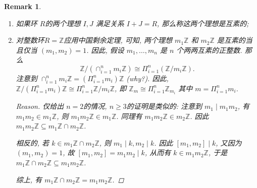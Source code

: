 \documentclass[a4paper,12pt]{ctexart}
\newcommand{\Z}{\mathbb{Z}}
\newtheorem{proof}{Proof}
\newtheorem{remark}{Remark}
\begin{document}
  \begin{remark}
    \begin{enumerate}[label=(\arabic{*})]
    \item 如果环 $ R $的两个理想 $ I, J $ 满足关系 $ I+J=R $, 那么称这两个理想是互素的; 
    \item 对整数环$ R=\Z $应用中国剩余定理, 可知, 两个理想 $ m_1\Z $ 和 $ m_2\Z $ 是互素的当且仅当 $ (m_1,m_2)=1 $.
    因此, 假设 $ m_1,\dots,m_n $ 是 $ n $ 个两两互素的正整数. 
    那么
    \[\Z/(\cap_{i=1}^n m_i\Z)\cong\Pi_{i=1}^n(\Z/m_i\Z).\]
    注意到 $ \cap_{i=1}^n m_i\Z=(\Pi_{i=1}^nm_i)\Z $ (why?).
    因此, $ \Z/(\Pi_{i=1}^nm_i)\Z\cong\Pi_{i=1}^n\Z/m_i\Z $, 即 $ \Z_m\cong\Pi_{i=1}^n\Z_{m_i} $ 其中 $ m=\Pi_{i=1}^nm_i $.
    \begin{proof}[Reason]
      仅给出 $ n=2 $的情况, $ n\ge 3 $的证明是类似的: 
      注意到 $ m_1\mid m_1m_2 $, 有 $ m_1m_2\in m_1\Z $, 则 $ m_1m_2\Z\in m_1\Z $. 
      同理有 $ m_1m_2\Z\in m_2\Z $. 因此 $ m_1m_2\Z\subseteq m_1\Z\cap m_2\Z $.

      相反的, 若 $ k\in m_1\Z\cap m_2\Z $, 则 $ m_1\mid k,m_2\mid k $. 因此 $ [m_1,m_2]\mid k $, 又因为 $ (m_1,m_2)=1 $, 
      故 $ [m_1,m_2]=m_1m_2\mid k $, 从而有 $ k\in m_1m_2\Z $, 于是 $ m_1\Z\cap m_2\Z\subseteq m_1m_2\Z $.

      综上, 有 $ m_1\Z\cap m_2\Z=m_1m_2\Z $.
    \end{proof}
    \end{enumerate}
  \end{remark}
\end{document}
